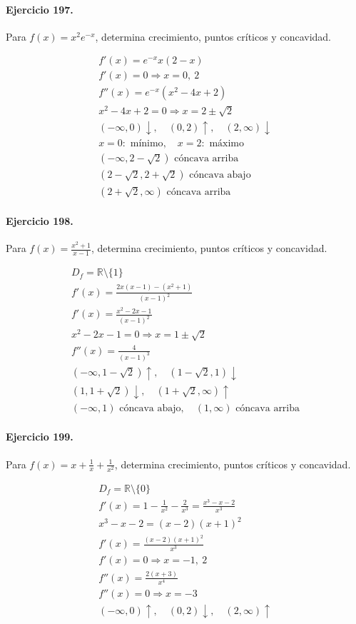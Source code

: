 \documentclass[11pt,a4paper]{article}
\begin{document}
\paragraph{Ejercicio 197.} Para $f(x)=x^2e^{-x}$, determina crecimiento, puntos críticos y concavidad.

\[
\begin{aligned}
f'(x)=e^{-x}x(2-x)\\
f'(x)=0\Rightarrow x=0,\ 2\\
f''(x)=e^{-x}(x^2-4x+2)\\
x^2-4x+2=0\Rightarrow x=2\pm\sqrt2\\
(-\infty,0)\downarrow,\quad(0,2)\uparrow,\quad(2,\infty)\downarrow\\
x=0:\text{{ mínimo}},\quad x=2:\text{{ máximo}}\\
(-\infty,2-\sqrt2)\text{{ cóncava arriba}}\\
(2-\sqrt2,2+\sqrt2)\text{{ cóncava abajo}}\\
(2+\sqrt2,\infty)\text{{ cóncava arriba}}
\end{aligned}
\]


\paragraph{Ejercicio 198.} Para $f(x)=\frac{x^2+1}{x-1}$, determina crecimiento, puntos críticos y concavidad.

\[
\begin{aligned}
D_f=\mathbb{R}\setminus\{1\}\\
f'(x)=\frac{2x(x-1)-(x^2+1)}{(x-1)^2}\\
f'(x)=\frac{x^2-2x-1}{(x-1)^2}\\
x^2-2x-1=0\Rightarrow x=1\pm\sqrt2\\
f''(x)=\frac{4}{(x-1)^3}\\
(-\infty,1-\sqrt2)\uparrow,\quad(1-\sqrt2,1)\downarrow\\
(1,1+\sqrt2)\downarrow,\quad(1+\sqrt2,\infty)\uparrow\\
(-\infty,1)\text{{ cóncava abajo}},\quad(1,\infty)\text{{ cóncava arriba}}
\end{aligned}
\]


\paragraph{Ejercicio 199.} Para $f(x)=x+\frac{1}{x}+\frac{1}{x^2}$, determina crecimiento, puntos críticos y concavidad.

\[
\begin{aligned}
D_f=\mathbb{R}\setminus\{0\}\\
f'(x)=1-\frac{1}{x^2}-\frac{2}{x^3}=\frac{x^3-x-2}{x^3}\\
x^3-x-2=(x-2)(x+1)^2\\
f'(x)=\frac{(x-2)(x+1)^2}{x^3}\\
f'(x)=0\Rightarrow x=-1,\ 2\\
f''(x)=\frac{2(x+3)}{x^4}\\
f''(x)=0\Rightarrow x=-3\\
(-\infty,0)\uparrow,\quad(0,2)\downarrow,\quad(2,\infty)\uparrow
\end{aligned}
\]
\end{document}
